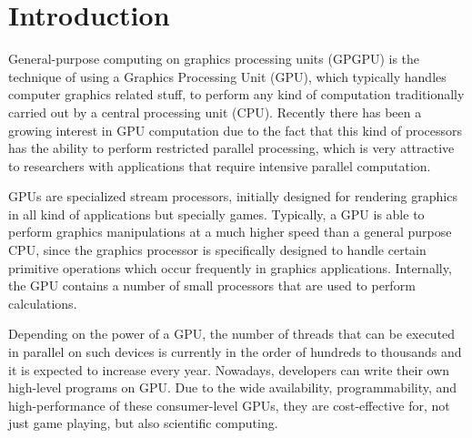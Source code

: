 \documentclass[review]{elsarticle}
\begin{document}




\section{Introduction}
\label{sec:intro}

General-purpose computing on graphics processing units (GPGPU) is the technique of using a Graphics Processing Unit (GPU), which typically handles computer graphics related stuff, to perform any kind of computation traditionally carried out by a central processing unit (CPU). Recently there has been a growing interest in GPU computation due to the fact that this kind of processors has the ability to perform restricted parallel processing, which is very attractive to researchers with applications that require intensive parallel computation.

GPUs are specialized stream processors, initially designed for rendering graphics in all kind of applications but specially games. Typically, a GPU is able to perform graphics manipulations at a much higher speed than a general purpose CPU, since the graphics processor is specifically designed to handle certain primitive operations which occur frequently in graphics applications. Internally, the GPU contains a number of small processors that are used to perform calculations. 

Depending on the power of a GPU, the number of threads that can be executed in parallel on such devices is currently in the order of
hundreds to thousands and it is expected to increase every year. Nowadays, developers can write their own high-level programs on GPU. Due to the wide availability, programmability, and high-performance of these consumer-level GPUs, they are cost-effective for, not just game playing, but also scientific computing.
\end{document}
